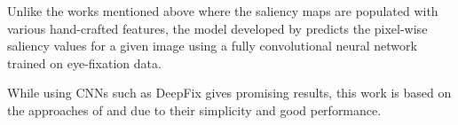 \documentclass{l4proj}
\begin{document}
Unlike the works mentioned above where the saliency maps are populated with various hand-crafted features, the model developed by \citet{kruthiventi2015} predicts the pixel-wise saliency values for a given image using a fully convolutional neural network trained on eye-fixation data. 

While using CNNs such as DeepFix gives promising results, this work is based on the approaches of \cite{Fattah} and \cite{Ozimek} due to their simplicity and good performance. 








\end{document}
